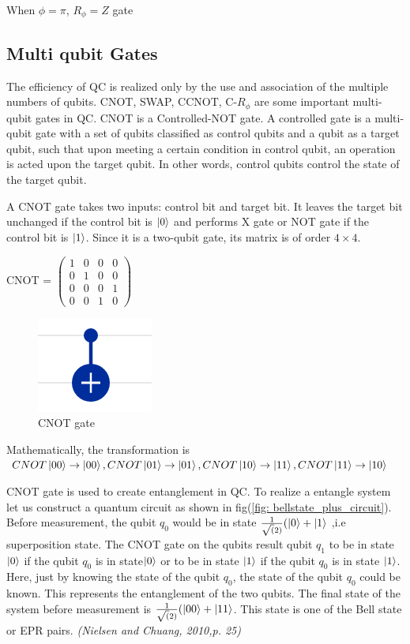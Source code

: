 When $\phi=\pi$, $R_{\phi} = Z$ gate

\subsection{Multi qubit Gates}
The efficiency of \acrshort{QC} is realized only by the use and association of the multiple numbers of qubits. CNOT, SWAP, CCNOT, C-$R_{\phi}$ are some important multi-qubit gates in \acrshort{QC}. CNOT is a Controlled-NOT gate. A controlled gate is a multi-qubit gate with a set of qubits classified as control qubits and a qubit as a target qubit, such that upon meeting a certain condition in control qubit, an operation is acted upon the target qubit. In other words, control qubits control the state of the target qubit.

A CNOT gate takes two inputs: control bit and target bit. It leaves the target bit unchanged if the control bit is $\ket{0}$ and performs X gate or NOT gate if the control bit is $\ket{1}$. Since it is a two-qubit gate, its matrix is of order $4\times 4$.

CNOT = $\begin{pmatrix} 1 &0 &0 &0 \\ 0 &1 &0 &0 \\ 0 &0 &0 &1 \\ 0 &0 &1 &0 \end{pmatrix}$ 
\begin{figure}[H]
    \centering
    \includegraphics{figures/CNOT.png} 
    \caption{CNOT gate}
    \label{fig:CNOT}
\end{figure}
Mathematically, the transformation is 
\\$CNOT\ket{00} \rightarrow \ket{00}, CNOT\ket{01} \rightarrow \ket{01}, CNOT\ket{10} \rightarrow \ket{11}, CNOT\ket{11} \rightarrow \ket{10}$

CNOT gate is used to create entanglement in \acrshort{QC}. To realize a entangle system let us construct a quantum circuit as shown in fig(\ref{fig: bellstate_plus_circuit}). Before measurement, the qubit $q_{0}$ would be in state $\frac{1}{\sqrt(2)}(\ket{0} + \ket{1}$ ,i.e superposition state. The CNOT gate on the qubits result qubit $q_{1}$ to be in state $\ket{0}$ if the qubit $q_{0}$ is in state$\ket{0}$ or to be in state $\ket{1}$ if the qubit $q_{0}$ is in state $\ket{1}$. Here, just by knowing the state of the qubit $q_{0}$, the state of the qubit $q_{0}$ could be known.\cite{anderzen2018} This represents the entanglement of the two qubits. The final state of the system before measurement is $\frac{1}{\sqrt(2)}(\ket{00} + \ket{11}$. This state is one of the Bell state or EPR pairs. \cite{Nielsen2002}\emph{(Nielsen and Chuang, 2010,p. 25)}

